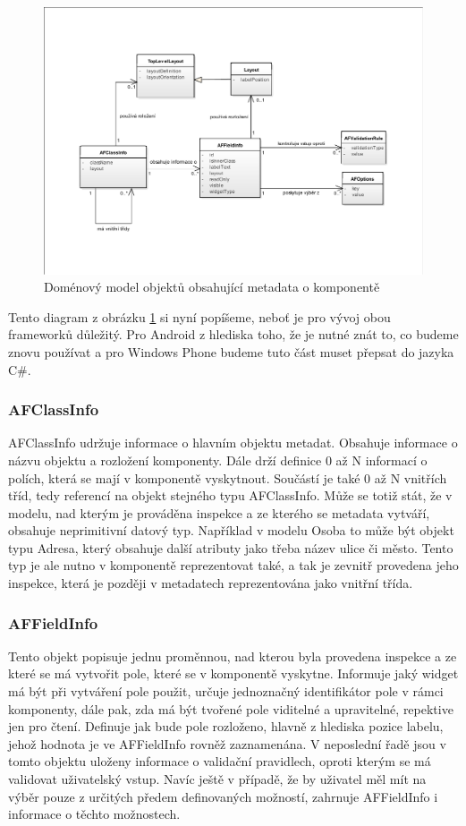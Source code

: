 \begin{figure}[h!]
\includegraphics[width=\textwidth]{figures/domainModel}
\caption{Doménový model objektů obsahující metadata o komponentě}
\label{img:metadataModel}
\end{figure}

Tento diagram z obrázku \ref{img:metadataModel} si nyní popíšeme, neboť je pro vývoj obou frameworků důležitý. Pro Android z hlediska toho, že je nutné znát to, co budeme znovu používat a pro Windows Phone budeme tuto část muset přepsat do jazyka C\#.
\subsubsection{AFClassInfo}
AFClassInfo udržuje informace o hlavním objektu metadat. Obsahuje informace o názvu objektu a rozložení komponenty. Dále drží definice 0 až N informací o polích, která se mají v komponentě vyskytnout. Součástí je také 0 až N vnitřích tříd, tedy referencí na objekt stejného typu AFClassInfo. Může se totiž stát, že v modelu, nad kterým je prováděna inspekce a ze kterého se metadata vytváří, obsahuje neprimitivní datový typ. Například v modelu Osoba to může být objekt typu Adresa, který obsahuje další atributy jako třeba název ulice či město. Tento typ je ale nutno v komponentě reprezentovat také, a tak je zevnitř provedena jeho inspekce, která je později v metadatech reprezentována jako vnitřní třída. 

\subsubsection{AFFieldInfo}
Tento objekt popisuje jednu proměnnou, nad kterou byla provedena inspekce a ze které se má vytvořit pole, které se v komponentě vyskytne. Informuje jaký widget má být při vytváření pole použit, určuje jednoznačný identifikátor pole v rámci komponenty, dále pak, zda má být tvořené pole viditelné a upravitelné, repektive jen pro čtení. Definuje jak bude pole rozloženo, hlavně z hlediska pozice labelu, jehož hodnota je ve AFFieldInfo rovněž zaznamenána. V neposlední řadě jsou v tomto objektu uloženy informace o validační pravidlech, oproti kterým se má validovat uživatelský vstup. Navíc ještě v případě, že by uživatel měl mít na výběr pouze z určitých předem definovaných možností, zahrnuje AFFieldInfo i informace o těchto možnostech. 

